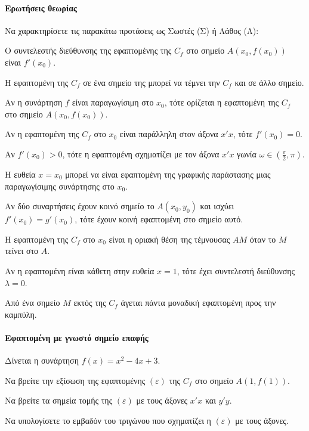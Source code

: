 \documentclass[11pt,a4paper,modern]{FFExercises}
\begin{document}

\paragraph{Ερωτήσεις θεωρίας}
\askhsh
Να χαρακτηρίσετε τις παρακάτω προτάσεις ως Σωστές (Σ) ή Λάθος (Λ):
\begin{alist}
    \item Ο συντελεστής διεύθυνσης της εφαπτομένης της $C_f$ στο σημείο $A(x_0, f(x_0))$ είναι $f'(x_0)$.
    \item Η εφαπτομένη της $C_f$ σε ένα σημείο της μπορεί να τέμνει την $C_f$ και σε άλλο σημείο.
    \item Αν η συνάρτηση $f$ είναι παραγωγίσιμη στο $x_0$, τότε ορίζεται η εφαπτομένη της $C_f$ στο σημείο $A(x_0, f(x_0))$.
    \item Αν η εφαπτομένη της $C_f$ στο $x_0$ είναι παράλληλη στον άξονα $x'x$, τότε $f'(x_0)=0$.
    \item Αν $f'(x_0) > 0$, τότε η εφαπτομένη σχηματίζει με τον άξονα $x'x$ γωνία $ \omega \in (\frac{\pi}{2}, \pi) $.
    \item Η ευθεία $x=x_0$ μπορεί να είναι εφαπτομένη της γραφικής παράστασης μιας παραγωγίσιμης συνάρτησης στο $ x_0 $.
    \item Αν δύο συναρτήσεις έχουν κοινό σημείο το $A(x_0, y_0)$ και ισχύει $f'(x_0)=g'(x_0)$, τότε έχουν κοινή εφαπτομένη στο σημείο αυτό.
    \item Η εφαπτομένη της $C_f$ στο $x_0$ είναι η οριακή θέση της τέμνουσας $AM$ όταν το $M$ τείνει στο $A$.
    \item Αν η εφαπτομένη είναι κάθετη στην ευθεία $x=1$, τότε έχει συντελεστή διεύθυνσης $\lambda=0$.
    \item Από ένα σημείο $M$ εκτός της $C_f$ άγεται πάντα μοναδική εφαπτομένη προς την καμπύλη.
\end{alist}

\paragraph{Εφαπτομένη με γνωστό σημείο επαφής}
\askhsh
Δίνεται η συνάρτηση $ f(x)=x^2-4x+3 $.
\begin{alist}
    \item Να βρείτε την εξίσωση της εφαπτομένης $(\varepsilon)$ της $C_f$ στο σημείο $ A(1,f(1)) $.
    \item Να βρείτε τα σημεία τομής της $(\varepsilon)$ με τους άξονες $ x'x $ και $ y'y $.
    \item Να υπολογίσετε το εμβαδόν του τριγώνου που σχηματίζει η $(\varepsilon)$ με τους άξονες.
\end{alist}
\end{document}
